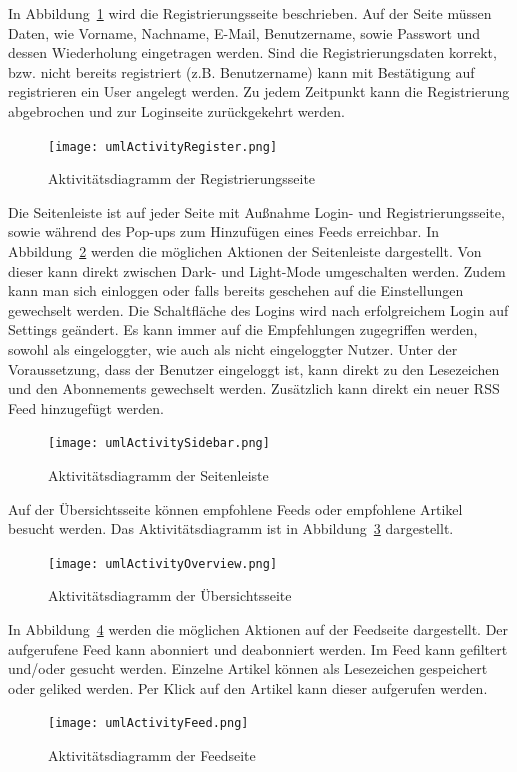 In Abbildung~\ref{fig:umlActivityRegister.png} wird die Registrierungsseite beschrieben.
Auf der Seite müssen Daten, wie Vorname, Nachname, E-Mail, Benutzername, sowie Passwort und dessen Wiederholung eingetragen werden.
Sind die Registrierungsdaten korrekt, bzw. nicht bereits registriert (z.B. Benutzername) kann mit Bestätigung auf registrieren ein User angelegt werden.
Zu jedem Zeitpunkt kann die Registrierung abgebrochen und zur Loginseite zurückgekehrt werden.
\begin{figure}
    \texttt{[image: umlActivityRegister.png]}
    \caption{Aktivitätsdiagramm der Registrierungsseite}
    \label{fig:umlActivityRegister.png}
\end{figure}

Die Seitenleiste ist auf jeder Seite mit Außnahme Login- und Registrierungsseite, sowie während des Pop-ups zum Hinzufügen eines Feeds erreichbar.
In Abbildung~\ref{fig:umlActivitySidebar.png} werden die möglichen Aktionen der Seitenleiste dargestellt.
Von dieser kann direkt zwischen Dark- und Light-Mode umgeschalten werden. Zudem kann man sich einloggen
oder falls bereits geschehen auf die Einstellungen gewechselt werden. Die Schaltfläche des Logins wird nach erfolgreichem Login auf Settings geändert.
Es kann immer auf die Empfehlungen zugegriffen werden, sowohl als eingeloggter, wie auch als nicht eingeloggter Nutzer.
Unter der Voraussetzung, dass der Benutzer eingeloggt ist, kann direkt zu den Lesezeichen und den Abonnements gewechselt werden.
Zusätzlich kann direkt ein neuer RSS Feed hinzugefügt werden.
\begin{figure}
    \texttt{[image: umlActivitySidebar.png]}
    \caption{Aktivitätsdiagramm der Seitenleiste}
    \label{fig:umlActivitySidebar.png}
\end{figure}

Auf der Übersichtsseite können empfohlene Feeds oder empfohlene Artikel besucht werden.
Das Aktivitätsdiagramm ist in Abbildung~\ref{fig:umlActivityOverview.png} dargestellt.
\begin{figure}
    \texttt{[image: umlActivityOverview.png]}
    \caption{Aktivitätsdiagramm der Übersichtsseite}
    \label{fig:umlActivityOverview.png}
\end{figure}

In Abbildung~\ref{fig:umlActivityFeed.png} werden die möglichen Aktionen auf der Feedseite dargestellt.
Der aufgerufene Feed kann abonniert und deabonniert werden. Im Feed kann gefiltert und/oder gesucht werden.
Einzelne Artikel können als Lesezeichen gespeichert oder geliked werden. Per Klick auf den Artikel kann dieser aufgerufen werden.
\begin{figure}
    \texttt{[image: umlActivityFeed.png]}
    \caption{Aktivitätsdiagramm der Feedseite}
    \label{fig:umlActivityFeed.png}
\end{figure}

